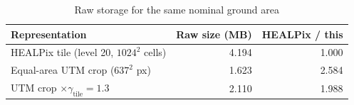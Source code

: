 \begin{table}[t]
\centering
\caption{Raw storage for the same nominal ground area}
\label{tab:storage_accounting}
\begin{tabular}{lrr}
\toprule
Representation & Raw size (MB) & HEALPix / this \\
\midrule
HEALPix tile (level 20, $1024^2$ cells) & 4.194 & 1.000 \\
Equal-area UTM crop ($637^2$ px) & 1.623 & 2.584 \\
UTM crop $\times\gamma_{\mathrm{tile}}=1.3$ & 2.110 & 1.988 \\
\bottomrule
\end{tabular}
\end{table}
